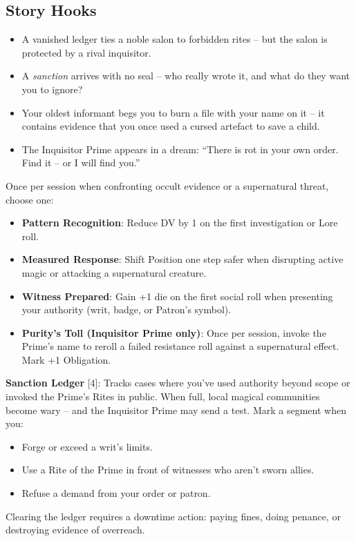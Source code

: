 \subsection*{Story Hooks}
\begin{itemize}
  \item A vanished ledger ties a noble salon to forbidden rites – but the salon is protected by a rival inquisitor.
  \item A \emph{sanction} arrives with no seal – who really wrote it, and what do they want you to ignore?
  \item Your oldest informant begs you to burn a file with your name on it – it contains evidence that you once used a cursed artefact to save a child.
  \item The Inquisitor Prime appears in a dream: “There is rot in your own order. Find it – or I will find you.”
\end{itemize}

\begin{tcolorbox}[colback=gray!5!white,colframe=gray!70!black,title=Witch Hunter’s Eye,fonttitle=\bfseries]
Once per session when confronting occult evidence or a supernatural threat, choose one:
\begin{itemize}
  \item \textbf{Pattern Recognition}: Reduce DV by 1 on the first investigation or Lore roll.
  \item \textbf{Measured Response}: Shift Position one step safer when disrupting active magic or attacking a supernatural creature.
  \item \textbf{Witness Prepared}: Gain +1 die on the first social roll when presenting your authority (writ, badge, or Patron’s symbol).
  \item \textbf{Purity’s Toll (Inquisitor Prime only)}: Once per session, invoke the Prime’s name to reroll a failed resistance roll against a supernatural effect. Mark +1 Obligation.
\end{itemize}
\end{tcolorbox}

\textbf{Sanction Ledger} [4]: Tracks cases where you’ve used authority beyond scope or invoked the Prime’s Rites in public. When full, local magical communities become wary – and the Inquisitor Prime may send a test. Mark a segment when you:
\begin{itemize}
  \item Forge or exceed a writ’s limits.
  \item Use a Rite of the Prime in front of witnesses who aren’t sworn allies.
  \item Refuse a demand from your order or patron.
\end{itemize}
Clearing the ledger requires a downtime action: paying fines, doing penance, or destroying evidence of overreach.
